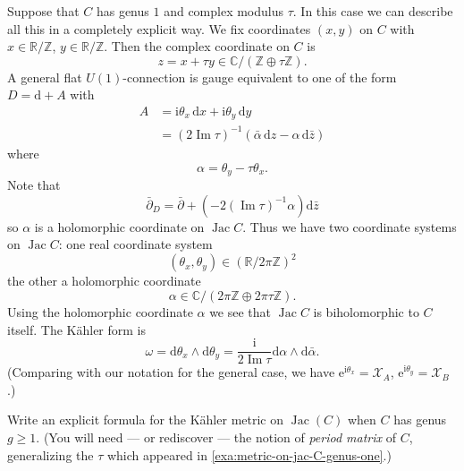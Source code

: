 \documentclass[12pt,letterpaper,reqno]{article}
\numberwithin{equation}{section}
\newcommand{\cX}{\ensuremath{\mathcal X}}
\newcommand{\R}{\ensuremath{\mathbb R}}
\newcommand{\C}{\ensuremath{\mathbb C}}
\newcommand{\Z}{\ensuremath{\mathbb Z}}
\newcommand{\kahler}{K\"ahler\xspace}
\newcommand{\I}{{\mathrm i}}
\newcommand{\e}{{\mathrm e}}
\newcommand{\de}{\mathrm{d}}
\newcommand{\ti}[1]{\textit{#1}}
\DeclareMathOperator{\im}{Im}
\DeclareMathOperator{\Jac}{Jac}
\begin{document}
\begin{example} \label{exa:metric-on-jac-C-genus-one}
Suppose that $C$ has genus $1$ and complex modulus $\tau$.
In this case we can describe all this in a completely explicit way.
We fix coordinates $(x,y)$ on $C$ with $x \in \R/\Z$, $y \in \R/\Z$.
Then the complex coordinate on $C$ is
\begin{equation}
  z = x + \tau y \in \C / (\Z \oplus \tau \Z).
\end{equation}
A general flat $U(1)$-connection
is gauge equivalent to one of the form $D = \de + A$ with
\begin{align}
  A &= \I \theta_x \, \de x + \I \theta_y \, \de y \\
  &= (2 \im \tau)^{-1} (\bar\alpha \, \de z - \alpha \, \de \bar{z})
\end{align}
where
\begin{equation}
  \alpha = \theta_y - \tau \theta_x.
\end{equation}
Note that
\begin{equation}
  \bar\partial_D = \bar\partial + (-2 (\im \tau)^{-1} \alpha) \de \bar{z}
\end{equation}
so $\alpha$ is a holomorphic coordinate on $\Jac C$.
Thus we have two coordinate systems on $\Jac C$: one
real coordinate system
\begin{equation}
(\theta_x, \theta_y) \in (\R / 2\pi\Z)^2
\end{equation}
the other a holomorphic coordinate
\begin{equation}
\alpha \in \C / \left( 2\pi \Z \oplus  2\pi \tau \Z\right).
\end{equation}
Using the holomorphic coordinate $\alpha$ we see that $\Jac C$ is biholomorphic to $C$ itself.
The \kahler form is
\begin{equation}
  \omega = \de \theta_x \wedge \de \theta_y = \frac{\I}{2 \im \tau} \de \alpha \wedge \de \bar\alpha.
\end{equation}
(Comparing with our notation for the general case,
we have $\e^{\I \theta_x} = \cX_A$, $\e^{\I \theta_y} = \cX_B$.)
\end{example}

\begin{exercise}
Write an explicit formula for the \kahler metric on $\Jac(C)$
when $C$ has genus $g \ge 1$. (You will need --- or rediscover ---
the notion of \ti{period matrix} of $C$, generalizing the $\tau$
which appeared in \autoref{exa:metric-on-jac-C-genus-one}.)
\end{exercise}
\end{document}
